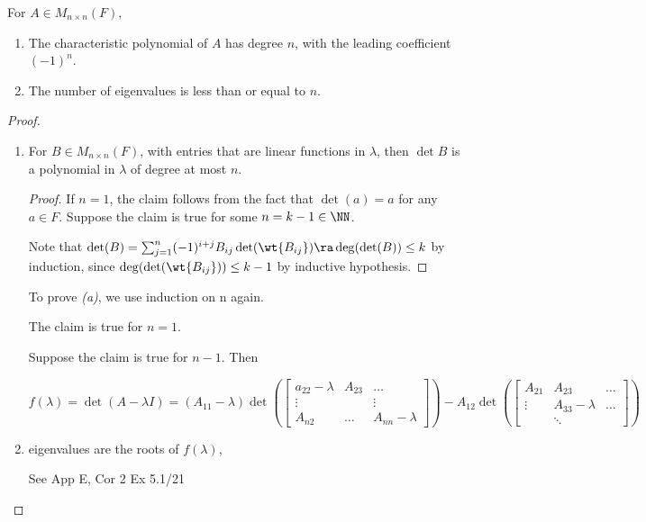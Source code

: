 \documentclass[11pt]{scrartcl}
\begin{document}
\begin{theorem}
  For \(A\in M_{n\times n}(F)\),
  \begin{enumerate}
  \item The characteristic polynomial of \(A\) has degree \(n\), with the leading coefficient \((-1)^{n}\).
  \item The number of eigenvalues  is less than or equal to \(n\).
  \end{enumerate}
\end{theorem}
\begin{proof}
\begin{enumerate}
\item
  \begin{claim*}
    For \(B\in M_{n\times n}(F)\), with entries that are linear
    functions in \(\lambda\), then \(\det B\) is a polynomial in
    \(\lambda\) of degree at most \(n\).
  \end{claim*}
\begin{proof}
  If \(n=1\), the claim follows from the fact that \(\det (a) = a \)
  for any \(a \in F\).
  Suppose the claim is true for some \(n = k-1\in \NN\).

  Note that
  \(\det(B) = \sum_{j=1}^{n} (-1)^{i+j} B_{ij}\det(\wt{B_{ij}})\ra
  \deg(\det(B)) \leq k\) by induction, since \(\deg(\det(\wt{B_{ij}})) \leq k-1\) by inductive hypothesis.
\end{proof}

To prove \emph{(a)}, we use induction on n again.

The claim is true for \(n = 1\).

Suppose the claim is true for \(n-1\). Then

\[
  f(\lambda) = \det(A-\lambda I) = (A_{11}-\lambda)\det(\begin{bmatrix}
    a_{22} - \lambda & A_{23} & \dots\\
    \vdots & & \vdots\\
    A_{n2} & \dots & A_{nn} - \lambda
  \end{bmatrix}) - A_{12} \det(\begin{bmatrix}
    A_{21} & A_{23} & \dots\\
    \vdots & A_{33} - \lambda & \dots\\
    & \ddots &
  \end{bmatrix}) %
\]
\item eigenvalues are the roots of \(f(\lambda)\),

  See App E, Cor 2
  Ex 5.1/21
\end{enumerate}
\end{proof}
\end{document}

